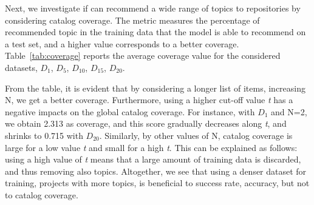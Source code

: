 

Next, we investigate if \TFa can recommend a wide range of topics to repositories by considering catalog coverage. The metric measures the percentage of recommended topic in the training data that the model is able to recommend on a test set, and a higher value corresponds to a better coverage. 
Table~\ref{tab:coverage} reports the average coverage value for the considered datasets, \ie $D_{1}$, $D_{5}$, $D_{10}$, $D_{15}$, $D_{20}$. %


From the table, it is evident that by considering a longer list of items, \ie increasing N, we get a better coverage. Furthermore, using a higher cut-off value \emph{t} has a negative impacts on the global catalog coverage. For instance, with $D_{1}$ and N=2, we obtain 2.313 as coverage, and this score gradually decreases along \emph{t}, and shrinks to 0.715 with $D_{20}$. Similarly, by other values of N, catalog coverage is large for a low value \emph{t} and small for a high \emph{t}. This can be explained as follows: using a high value of \emph{t} means that a large amount of training data is discarded, and thus removing also topics. Altogether, we see that using a denser dataset for training, \ie projects with more topics, is beneficial to success rate, accuracy, but not to catalog coverage.


